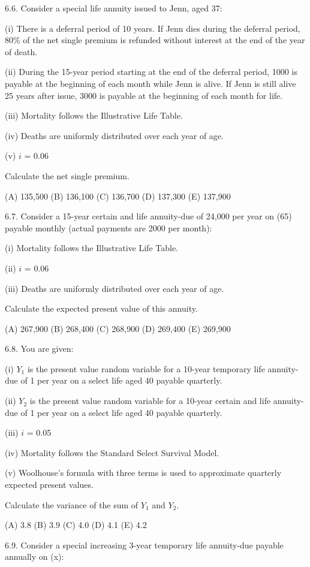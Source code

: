 \documentclass[]{book}
\begin{document}
6.6. Consider a special life annuity issued to Jenn, aged 37:

(i) There is a deferral period of 10 years. If Jenn dies during the
deferral period, 80\% of the net single premium is refunded without
interest at the end of the year of death.

(ii) During the 15-year period starting at the end of the deferral
period, 1000 is payable at the beginning of each month while Jenn is
alive. If Jenn is still alive 25 years after issue, 3000 is payable at
the beginning of each month for life.

(iii) Mortality follows the Illustrative Life Table.

(iv) Deaths are uniformly distributed over each year of age.

(v) \(i\) = 0.06

Calculate the net single premium.

(A) 135,500 (B) 136,100 (C) 136,700 (D) 137,300 (E) 137,900

6.7. Consider a 15-year certain and life annuity-due of 24,000 per year
on (65) payable monthly (actual payments are 2000 per month):

(i) Mortality follows the Illustrative Life Table.

(ii) \(i\) = 0.06

(iii) Deaths are uniformly distributed over each year of age.

Calculate the expected present value of this annuity.

(A) 267,900 (B) 268,400 (C) 268,900 (D) 269,400 (E) 269,900

6.8. You are given:

(i) \(Y_1\) is the present value random variable for a 10-year temporary
life annuity-due of 1 per year on a select life aged 40 payable
quarterly.

(ii) \(Y_2\) is the present value random variable for a 10-year certain
and life annuity-due of 1 per year on a select life aged 40 payable
quarterly.

(iii) \(i\) = 0.05

(iv) Mortality follows the Standard Select Survival Model.

(v) Woolhouse's formula with three terms is used to approximate
quarterly expected present values.

Calculate the variance of the sum of \(Y_1\) and \(Y_2\).

(A) 3.8 (B) 3.9 (C) 4.0 (D) 4.1 (E) 4.2

6.9. Consider a special increasing 3-year temporary life annuity-due
payable annually on (x):
\end{document}
